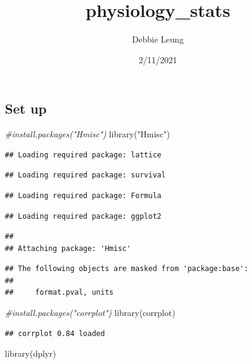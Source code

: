 \documentclass[
]{article}
\title{physiology\_stats}
\author{Debbie Leung}
\date{2/11/2021}
\newenvironment{Shaded}{\begin{snugshade}}{\end{snugshade}}
\newcommand{\CommentTok}[1]{\textcolor[rgb]{0.56,0.35,0.01}{\textit{#1}}}
\newcommand{\FunctionTok}[1]{\textcolor[rgb]{0.00,0.00,0.00}{#1}}
\newcommand{\NormalTok}[1]{#1}
\newcommand{\StringTok}[1]{\textcolor[rgb]{0.31,0.60,0.02}{#1}}
\begin{document}
\maketitle

\hypertarget{set-up}{%
\subsection{Set up}\label{set-up}}

\begin{Shaded}
\begin{Highlighting}[]
\CommentTok{\#install.packages("Hmisc")}
\FunctionTok{library}\NormalTok{(}\StringTok{"Hmisc"}\NormalTok{)}
\end{Highlighting}
\end{Shaded}

\begin{verbatim}
## Loading required package: lattice
\end{verbatim}

\begin{verbatim}
## Loading required package: survival
\end{verbatim}

\begin{verbatim}
## Loading required package: Formula
\end{verbatim}

\begin{verbatim}
## Loading required package: ggplot2
\end{verbatim}

\begin{verbatim}
## 
## Attaching package: 'Hmisc'
\end{verbatim}

\begin{verbatim}
## The following objects are masked from 'package:base':
## 
##     format.pval, units
\end{verbatim}

\begin{Shaded}
\begin{Highlighting}[]
\CommentTok{\#install.packages("corrplot")}
\FunctionTok{library}\NormalTok{(corrplot)}
\end{Highlighting}
\end{Shaded}

\begin{verbatim}
## corrplot 0.84 loaded
\end{verbatim}

\begin{Shaded}
\begin{Highlighting}[]
\FunctionTok{library}\NormalTok{(dplyr)}
\end{Highlighting}
\end{Shaded}
\end{document}
